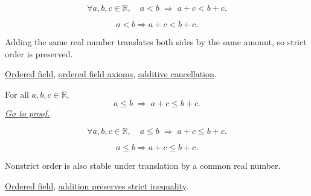 \begin{remark*}
\[
  \forall a, b, c \in \mathbb{R},\quad
  a < b \;\Rightarrow\; a + c < b + c.
\]
\end{remark*}

\begin{remark*}
\[
a<b\Rightarrow a+c<b+c.
\]
\end{remark*}

\begin{remark*}[Interpretation]
Adding the same real number translates both sides by the same amount, so strict order is preserved.
\end{remark*}

\begin{dependencies}
\hyperref[def:real-ordered-field]{Ordered field},
\hyperref[thm:q-is-an-ordered-field]{ordered field axioms},
\hyperref[cor:additive-cancellation-on-q]{additive cancellation}.
\end{dependencies}


\begin{theorem}
\label{thm:ineq-nonstrict-add-both-sides}
For all $a, b, c \in \mathbb{R}$,
\[
  a \le b \;\Rightarrow\; a + c \le b + c.
\]
\hyperref[prf:ineq-nonstrict-add-both-sides]{\textit{Go to proof.}}
\end{theorem}



\begin{remark*}
\[
  \forall a, b, c \in \mathbb{R},\quad
  a \le b \;\Rightarrow\; a + c \le b + c.
\]
\end{remark*}

\begin{remark*}
\[
a\le b\Rightarrow a+c\le b+c.
\]
\end{remark*}

\begin{remark*}[Interpretation]
Nonstrict order is also stable under translation by a common real number.
\end{remark*}

\begin{dependencies}
\hyperref[def:real-ordered-field]{Ordered field},
\hyperref[thm:ineq-add-both-sides]{addition preserves strict inequality}.
\end{dependencies}

